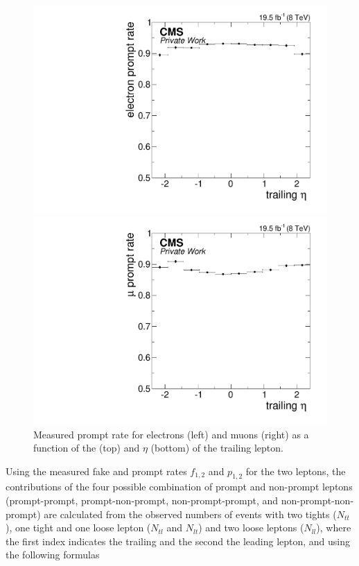 \begin{figure}[htbp]
\begin{minipage}[t]{0.49\textwidth}
\includegraphics[width=\textwidth]{plots/BG/nonPrompt/promptRate_ele_Inclusive_Full2012_TrailingEta_None.pdf}
\end{minipage}
\begin{minipage}[t]{0.49\textwidth}
\includegraphics[width=\textwidth]{plots/BG/nonPrompt/promptRate_mu_Inclusive_Full2012_TrailingEta_None.pdf}
\end{minipage}
\caption{Measured prompt rate for electrons (left) and muons (right) as a function of the \pt (top) and $\eta$ (bottom) of the trailing lepton.}


\label{fig:promptRate}
\end{figure} 
Using the measured fake and prompt rates $f_{1,2}$ and $p_{1,2}$ for the two leptons, the contributions of the four possible combination of prompt and non-prompt leptons (prompt-prompt, prompt-non-prompt, non-prompt-prompt, and non-prompt-non-prompt) are calculated from the observed numbers of events with two tights ($N_{tt}$), one tight and one loose lepton ($N_{tl}$ and $N_{lt}$) and two loose leptons ($N_{ll}$), where the first index indicates the trailing and the second the leading lepton,  and  using the following formulas
